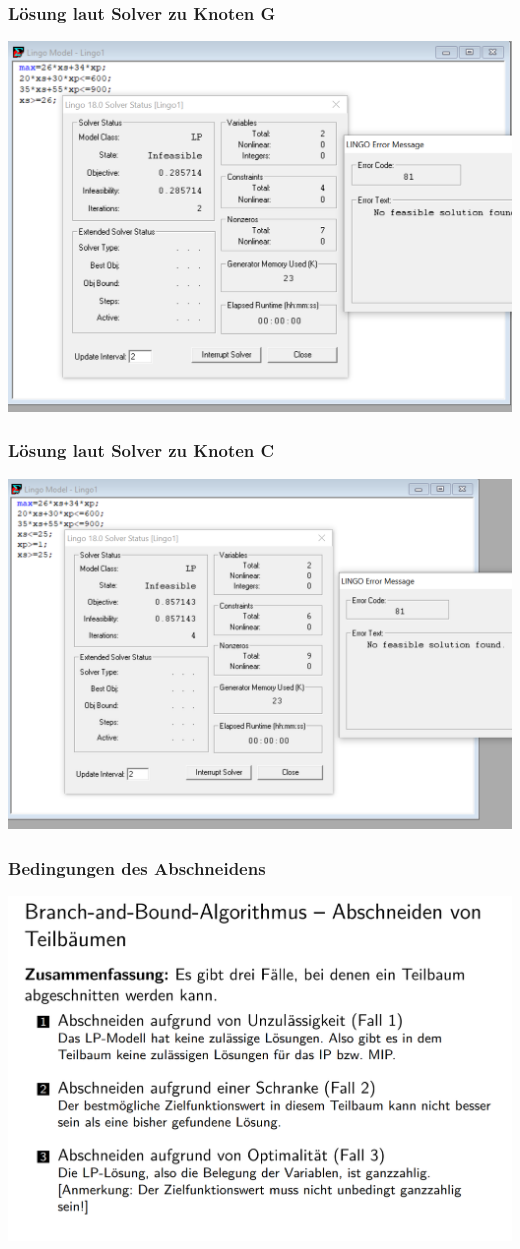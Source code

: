 \documentclass[a4paper,11pt]{article}
\begin{document}
\subsubsection*{Lösung laut Solver zu Knoten G}
\begin{centering}
	\includegraphics[width=0.65\linewidth]{src/blatt_5_aufgabe_2_teilaufgabe_b_knoten_c_loesung_solver.png}
\end{centering}

\subsubsection*{Lösung laut Solver zu Knoten C}
\begin{centering}
	\includegraphics[width=0.65\linewidth]{src/blatt_5_aufgabe_2_teilaufgabe_b_knoten_g_loesung_solver.png}
\end{centering}


\subsubsection*{Bedingungen des Abschneidens}
\begin{centering}
	\includegraphics[width=0.65\linewidth]{src/blatt_5_aufgabe_2_fallunterscheidung_abschneiden.png}
\end{centering}
\end{document}
